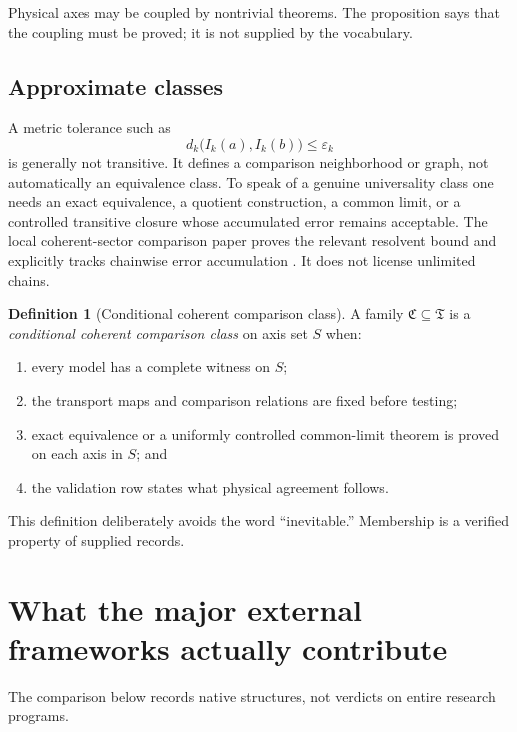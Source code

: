 \documentclass[11pt]{article}
\theoremstyle{definition}
\newtheorem{definition}[theorem]{Definition}
\theoremstyle{remark}
\begin{document}
Physical axes may be coupled by nontrivial theorems. The proposition says that
the coupling must be proved; it is not supplied by the vocabulary.

\subsection{Approximate classes}

A metric tolerance such as
\[
 d_k\bigl(I_k(a),I_k(b)\bigr)\leq\varepsilon_k
\]
is generally not transitive. It defines a comparison neighborhood or graph,
not automatically an equivalence class. To speak of a genuine universality
class one needs an exact equivalence, a quotient construction, a common limit,
or a controlled transitive closure whose accumulated error remains acceptable.
The local coherent-sector comparison paper proves the relevant resolvent bound
and explicitly tracks chainwise error accumulation
\cite{NeroLocalRobustness2026}. It does not license unlimited chains.

\begin{definition}[Conditional coherent comparison class]
A family \(\mathfrak C\subseteq\mathfrak T\) is a \emph{conditional coherent
comparison class} on axis set \(S\) when:
\begin{enumerate}[label=(\roman*)]
  \item every model has a complete witness on \(S\);
  \item the transport maps and comparison relations are fixed before testing;
  \item exact equivalence or a uniformly controlled common-limit theorem is
  proved on each axis in \(S\); and
  \item the validation row states what physical agreement follows.
\end{enumerate}
\end{definition}

This definition deliberately avoids the word ``inevitable.'' Membership is a
verified property of supplied records.

\section{What the major external frameworks actually contribute}
\label{sec:external}

The comparison below records native structures, not verdicts on entire research
programs.
\end{document}
